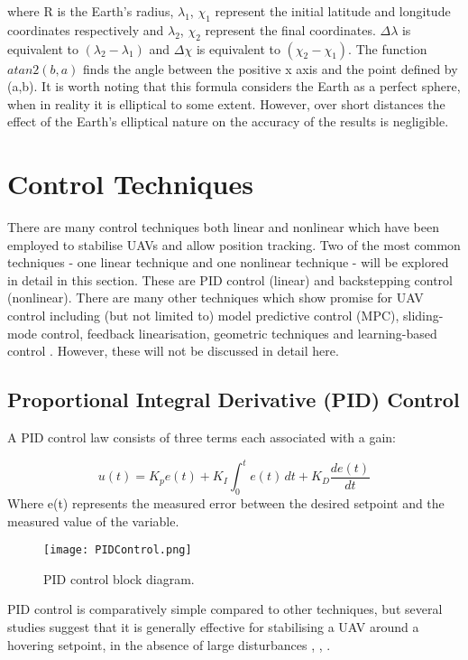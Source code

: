 where R is the Earth's radius, $\lambda_{1}$, $\chi_{1}$ represent the initial latitude and longitude coordinates respectively and $\lambda_{2}$, $\chi_{2}$ represent the final coordinates. $\Delta\lambda$ is equivalent to $(\lambda_{2}-\lambda_{1})$ and $\Delta\chi$ is equivalent to $(\chi_{2}-\chi_{1})$. The function $atan2(b,a)$ finds the angle between the positive x axis and the point defined by (a,b).
It is worth noting that this formula considers the Earth as a perfect sphere, when in reality it is elliptical to some extent. However, over short distances the effect of the Earth's elliptical nature on the accuracy of the results is negligible.


\section{Control Techniques}
There are many control techniques both linear and nonlinear which have been employed to stabilise UAVs and allow position tracking. Two of the most common techniques - one linear technique and one nonlinear technique - will be explored in detail in this section. These are PID control (linear) and backstepping control (nonlinear). There are many other techniques which show promise for UAV control including (but not limited to) model predictive control (MPC), sliding-mode control, feedback linearisation, geometric techniques and learning-based control \cite{Rubi2019}. However, these will not be discussed in detail here.  
\subsection{Proportional Integral Derivative (PID) Control}\label{section:PIDBackground}
A PID control law consists of three terms each associated with a gain:

\[u(t)=K_{p}e(t)+K_{I}\int_{0}^{t}e(t)\,dt+K_{D}\frac{de(t)}{dt}\]
Where e(t) represents the measured error between the desired setpoint and the measured value of the variable. 

\begin{figure}[htb]
	\texttt{[image: PIDControl.png]}%
	\caption{PID control block diagram.}%
	\label{fig:PIDControl}%
\end{figure}

PID control is comparatively simple compared to other techniques, but several studies suggest that it is generally effective for stabilising a UAV around a hovering setpoint, in the absence of large disturbances \cite{Bouabdallah2006}, \cite{Pounds2010}, \cite{Moussid2015}. \\

